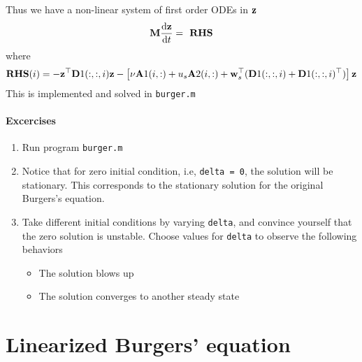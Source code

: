 \documentclass[12pt]{article}
\begin{document}
Thus we have a non-linear system of first order ODEs in ${\mathbf z}$
\begin{eqnarray*}
 {\mathbf M} \frac{\textrm{d} {\mathbf z}}{\textrm{d} t} = \textbf{ RHS} 
\end{eqnarray*}
where 
\begin{eqnarray*}
 \textbf{RHS}(i) = - {\mathbf z}^\top {\mathbf D}1(:,:,i) {\mathbf z} - \left[ \nu {\mathbf A}1(i,:) + u_s {\mathbf A}2(i,:) + {\mathbf w}_s^\top ({\mathbf D}1(:,:,i) + {\mathbf D}1(:,:,i)^\top) \right] {\mathbf z}
\end{eqnarray*}
This is implemented and solved in {\tt burger.m}

\paragraph{Excercises}

\begin{enumerate}

\item Run program {\tt burger.m}

\item Notice that for zero initial condition, i.e, {\tt delta = 0}, the solution will be stationary. This corresponds to the stationary solution for the original Burgers's equation.

\item Take different initial conditions by varying {\tt delta}, and convince yourself that the zero solution is unstable. Choose values for {\tt delta} to observe the following behaviors
   \begin{itemize}
    \item The solution blows up
    \item The solution converges to another steady state
   \end{itemize}
\end{enumerate}


\section{Linearized Burgers' equation}
\end{document}
